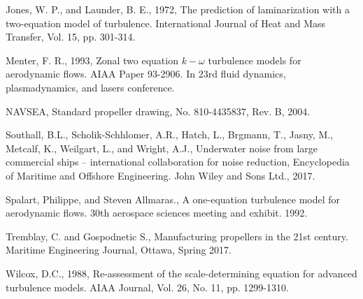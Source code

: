 \documentclass[onecolumn,11pt]{report}
\begin{document}
Jones, W. P., and Launder, B. E., 1972, The prediction of laminarization with a two-equation model of turbulence. International Journal of Heat and Mass Transfer, Vol. 15, pp. 301-314.

Menter, F. R., 1993, Zonal two equation $k-\omega$ turbulence models for aerodynamic flows. AIAA Paper 93-2906. In 23rd fluid dynamics, plasmadynamics, and lasers conference.

NAVSEA, Standard propeller drawing, No. 810-4435837, Rev. B, 2004. 

Southall, B.L., Scholik-Schhlomer, A.R., Hatch, L., Brgmann, T., Jasny, M., Metcalf, K., Weilgart, L., and Wright, A.J., Underwater noise from large commercial ships – international collaboration for noise reduction, Encyclopedia of Maritime and Offshore Engineering. John Wiley and Sons Ltd., 2017. 

Spalart, Philippe, and Steven Allmaras., A one-equation turbulence model for aerodynamic flows. 30th aerospace sciences meeting and exhibit. 1992.

Tremblay, C. and Gospodnetic S., Manufacturing propellers in the 21st century. Maritime Engineering Journal, Ottawa, Spring 2017.

Wilcox, D.C., 1988, Re-assessment of the scale-determining equation for advanced turbulence models. AIAA Journal, Vol. 26, No. 11, pp. 1299-1310.



%

 
\end{document}
